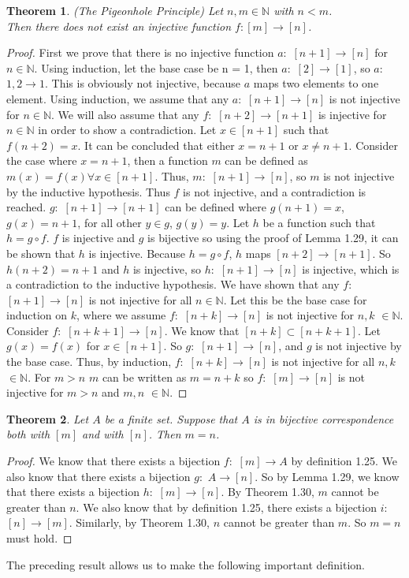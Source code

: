 \documentclass[12pt]{article}
\newtheorem{theorem}{Theorem}[section]
\theoremstyle{definition}
\numberwithin{equation}{subsection}
\begin{document}
{\begin{theorem} (The Pigeonhole Principle)
Let $n, m\in {\mathbb N}$ with $n<m$.  \\ Then there does not exist an injective function
$f:[m]\rightarrow [n]$.
\end{theorem}
\begin{proof}
First we prove that there is no injective function $a:$ $[n+1] \to [n]$ for $n \in \mathbb N$. Using induction, let the base case be n = 1, then $a:$ $[2]\to[1]$, so $a:$ ${1,2} \to {1}$. This is obviously not injective, because $a$ maps two elements to one element. Using induction, we assume that any $a:$ $[n+1] \to [n]$ is not injective for $n \in \mathbb N$. We will also assume that any $f:$ $[n+2] \to [n+1]$ is injective for $n \in \mathbb N$ in order to show a contradiction. Let $x \in [n+1]$ such that $f(n+2) = x$. It can be concluded that either $x = n+1$ or $x \not= n+1$. Consider the case where $x = n+1$, then a function $m$ can be defined as $m(x) = f(x) \forall x \in [n+1]$. Thus, $m:$ $[n+1]\to[n]$, so $m$ is not injective by the inductive hypothesis. Thus $f$ is not injective, and a contradiction is reached.
$g:$ $[n+1] \to [n+1]$ can be defined where $g(n+1) = x$, $g(x) = n + 1$, for all other $y \in g$, $g(y) = y$. Let $h$ be a function such that $h = g \circ f$. $f$ is injective and $g$ is bijective so using the proof of Lemma 1.29, it can be shown that $h$ is injective. Because $h = g \circ f$, $h$ maps $[n+2] \to [n+1]$. So $h(n+2) = n+1$ and $h$ is injective, so $h:$ $[n+1] \to [n]$ is injective, which is a contradiction to the inductive hypothesis. 
We have shown that any $f:$ $[n+1] \to [n]$ is not injective for all $n \in \mathbb N$. Let this be the base case for induction on $k$, where we assume $f: $ $[n+k] \to [n]$ is not injective for $n,k$ $ \in \mathbb N$. Consider $f: $ $[n+k+1] \to [n]$. We know that $[n+k] \subset [n+k+1]$. Let $g(x) = f(x)$ for $x \in [n+1]$. So $g: $ $[n+1] \to [n]$, and $g$ is not injective by the base case. Thus, by induction, $f: $ $[n+k] \to [n]$ is not injective for all $n,k$ $ \in \mathbb N$. For $m > n$ $m$ can be written as $m = n + k$ so $f: $ $[m] \to [n]$ is not injective for $m > n$ and $m,n$ $ \in \mathbb N$.
\end{proof}

\begin{theorem}  \label{bij}
Let $A$ be a finite set. Suppose that $A$ is in bijective correspondence both with $[m]$ and with $[n]$.  Then $m = n$.
\end{theorem}
\begin{proof}
We know that there exists a bijection $f: $ $[m] \to A$ by definition 1.25. We also know that there exists a bijection $g: $ $A \to [n]$. So by Lemma 1.29, we know that there exists a bijection $h: $ $[m] \to [n]$. By Theorem 1.30, $m$ cannot be greater than $n$. We also know that by definition 1.25, there exists a bijection $i: $ $[n] \to [m]$. Similarly, by Theorem 1.30, $n$ cannot be greater than $m$. So $m = n$ must hold.
\end{proof}
The preceding result allows us to make the following important definition.

}
\end{document}
